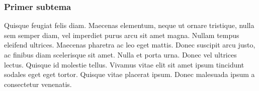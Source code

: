 \subsubsection*{Primer subtema}

Quisque feugiat felis diam. Maecenas elementum, neque ut ornare tristique, nulla sem semper diam, vel imperdiet purus arcu sit amet magna. Nullam tempus eleifend ultrices. Maecenas pharetra ac leo eget mattis. Donec suscipit arcu justo, ac finibus diam scelerisque sit amet. Nulla et porta urna. Donec vel ultrices lectus. Quisque id molestie tellus. Vivamus vitae elit sit amet ipsum tincidunt sodales eget eget tortor. Quisque vitae placerat ipsum. Donec malesuada ipsum a consectetur venenatis.

